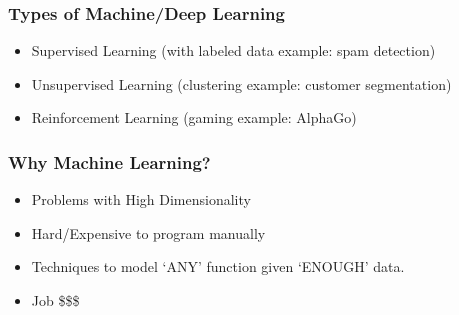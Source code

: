 \begin{frame}[fragile]\frametitle{ Types of Machine/Deep Learning}
\begin{itemize}
\item Supervised Learning (with labeled data example: spam detection)
\item Unsupervised Learning (clustering example: customer segmentation)
\item Reinforcement Learning (gaming example: AlphaGo)
\end{itemize}
\end{frame}


\begin{frame}[fragile]\frametitle{Why Machine Learning?}
\begin{itemize}
\item Problems with High Dimensionality
\item Hard/Expensive to program manually
\item Techniques to model `ANY' function given `ENOUGH' data.
\item Job \$\$\$
\end{itemize}
\end{frame}



